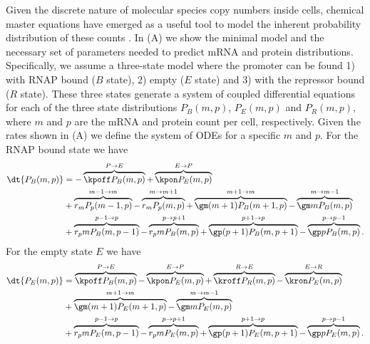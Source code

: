 Given the discrete nature of molecular species copy numbers inside cells,
chemical master equations have emerged as a useful tool to model the inherent
probability distribution of these counts \cite{Sanchez2013}. In
(A) we show the minimal model and the necessary set of
parameters needed to predict mRNA and protein distributions. Specifically, we
assume a three-state model where the promoter can be found 1) with RNAP bound
($B$ state), 2) empty ($E$ state) and 3) with the repressor bound ($R$ state).
These three states generate a system of coupled differential equations for each
of the three state distributions $P_B(m, p)$, $P_E(m, p)$ and $P_R(m, p)$, where
$m$ and $p$ are the mRNA and protein count per cell, respectively. Given the
rates shown in (A) we define the system of ODEs for a
specific $m$ and $p$. For the RNAP bound state we have
\begin{equation}
  \begin{aligned}
    \dt{P_B(m, p)} &=
    - \overbrace{\kpoff P_B(m, p)}^{P \rightarrow E} %
    + \overbrace{\kpon P_E(m, p)}^{E \rightarrow P}\\ %
    &+ \overbrace{r_m P_p(m-1, p)}^{m-1 \rightarrow m} %
    - \overbrace{r_m P_p(m, p)}^{m \rightarrow m+1}%
    + \overbrace{\gm (m + 1) P_B(m+1 , p)}^{m+1 \rightarrow m} %
    - \overbrace{\gm m P_B(m , p)}^{m \rightarrow m-1}\\ %
    &+ \overbrace{r_p m P_B(m, p - 1)}^{p-1 \rightarrow p} %
    - \overbrace{r_p m P_B(m, p)}^{p \rightarrow p+1} %
    + \overbrace{\gp (p + 1) P_B(m, p + 1)}^{p + 1 \rightarrow p} %
    - \overbrace{\gp p P_B(m, p)}^{p \rightarrow p-1}. %
  \end{aligned}
\end{equation}
For the empty state $E$ we have
\begin{equation}
  \begin{aligned}
    \dt{P_E(m, p)} &=
    \overbrace{\kpoff P_B(m, p)}^{P \rightarrow E} %
    - \overbrace{\kpon P_E(m, p)}^{E \rightarrow P} %
    + \overbrace{\kroff P_R(m, p)}^{R \rightarrow E} %
    - \overbrace{\kron P_E(m, p)}^{E \rightarrow R}\\ %
    &+ \overbrace{\gm (m + 1) P_E(m+1 , p)}^{m+1 \rightarrow m} %
    - \overbrace{\gm m P_E(m , p)}^{m \rightarrow m-1}\\ %
    &+ \overbrace{r_p m P_E(m, p - 1)}^{p-1 \rightarrow p} %
    - \overbrace{r_p m P_E(m, p)}^{p \rightarrow p+1} %
    + \overbrace{\gp (p + 1) P_E(m, p + 1)}^{p + 1 \rightarrow p} %
    - \overbrace{\gp p P_E(m, p)}^{p \rightarrow p-1}. %
  \end{aligned}
\end{equation}
